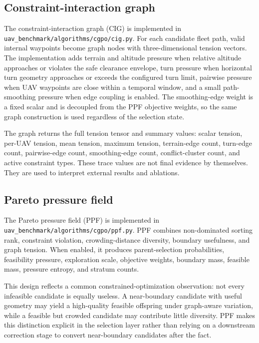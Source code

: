 \documentclass[a4paper,fleqn]{cas-dc}
\begin{document}
\subsection{Constraint-interaction graph}

The constraint-interaction graph (CIG) is implemented in \texttt{uav\_benchmark/algorithms/cgpo/cig.py}. For each candidate fleet path, valid internal waypoints become graph nodes with three-dimensional tension vectors. The implementation adds terrain and altitude pressure when relative altitude approaches or violates the safe clearance envelope, turn pressure when horizontal turn geometry approaches or exceeds the configured turn limit, pairwise pressure when UAV waypoints are close within a temporal window, and a small path-smoothing pressure when edge coupling is enabled. The smoothing-edge weight is a fixed scalar and is decoupled from the PPF objective weights, so the same graph construction is used regardless of the selection state.

The graph returns the full tension tensor and summary values: scalar tension, per-UAV tension, mean tension, maximum tension, terrain-edge count, turn-edge count, pairwise-edge count, smoothing-edge count, conflict-cluster count, and active constraint types. These trace values are not final evidence by themselves. They are used to interpret external results and ablations.

\subsection{Pareto pressure field}

The Pareto pressure field (PPF) is implemented in \texttt{uav\_benchmark/algorithms/cgpo/ppf.py}. PPF combines non-dominated sorting rank, constraint violation, crowding-distance diversity, boundary usefulness, and graph tension. When enabled, it produces parent-selection probabilities, feasibility pressure, exploration scale, objective weights, boundary mass, feasible mass, pressure entropy, and stratum counts.

This design reflects a common constrained-optimization observation: not every infeasible candidate is equally useless. A near-boundary candidate with useful geometry may yield a high-quality feasible offspring under graph-aware variation, while a feasible but crowded candidate may contribute little diversity. PPF makes this distinction explicit in the selection layer rather than relying on a downstream correction stage to convert near-boundary candidates after the fact.
\end{document}
